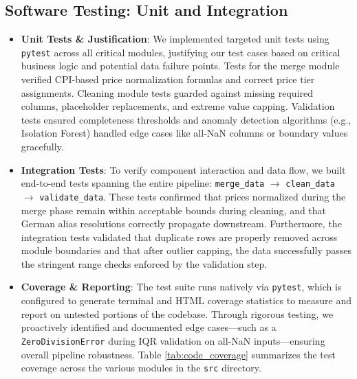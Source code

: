 \documentclass[12pt, a4paper]{article}
\begin{document}
\subsection{Software Testing: Unit and Integration}
\begin{itemize}
    \item \textbf{Unit Tests \& Justification}: We implemented targeted unit tests using \texttt{pytest} across all critical modules, justifying our test cases based on critical business logic and potential data failure points. Tests for the merge module verified CPI-based price normalization formulas and correct price tier assignments. Cleaning module tests guarded against missing required columns, placeholder replacements, and extreme value capping. Validation tests ensured completeness thresholds and anomaly detection algorithms (e.g., Isolation Forest) handled edge cases like all-NaN columns or boundary values gracefully.
    \item \textbf{Integration Tests}: To verify component interaction and data flow, we built end-to-end tests spanning the entire pipeline: \texttt{merge\_data} $\rightarrow$ \texttt{clean\_data} $\rightarrow$ \texttt{validate\_data}. These tests confirmed that prices normalized during the merge phase remain within acceptable bounds during cleaning, and that German alias resolutions correctly propagate downstream. Furthermore, the integration tests validated that duplicate rows are properly removed across module boundaries and that after outlier capping, the data successfully passes the stringent range checks enforced by the validation step.
    \item \textbf{Coverage \& Reporting}: The test suite runs natively via \texttt{pytest}, which is configured to generate terminal and HTML coverage statistics to measure and report on untested portions of the codebase. Through rigorous testing, we proactively identified and documented edge cases---such as a \texttt{ZeroDivisionError} during IQR validation on all-NaN inputs---ensuring overall pipeline robustness. Table \ref{tab:code_coverage} summarizes the test coverage across the various modules in the \texttt{src} directory.
\end{itemize}
\end{document}

